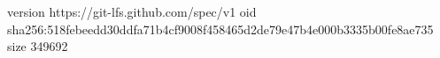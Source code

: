 version https://git-lfs.github.com/spec/v1
oid sha256:518febeedd30ddfa71b4cf9008f458465d2de79e47b4e000b3335b00fe8ae735
size 349692
